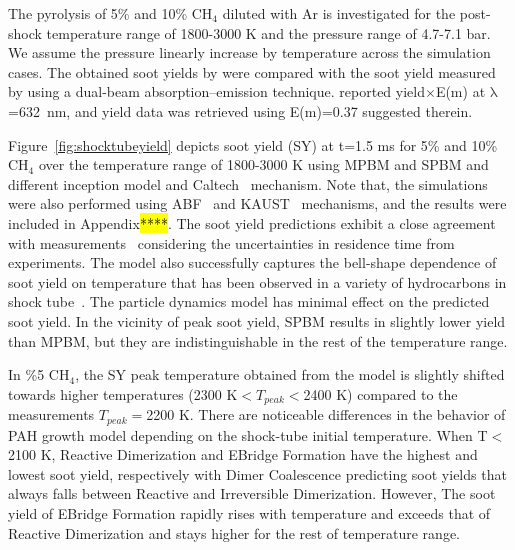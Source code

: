 The pyrolysis of 5\% and 10\% $\mathrm{CH_4}$ diluted with Ar is investigated for the post-shock temperature range of 1800-3000 K and the pressure range of 4.7-7.1 bar. We assume the pressure linearly increase by temperature across the simulation cases. The obtained soot yields by were compared with the soot yield measured by \citet{agafonov2016unified} using a dual-beam absorption–emission technique. \citet{agafonov2016unified} reported yield$\times$E(m) at $\mathrm{\lambda}$=632~nm, and yield data was retrieved using E(m)=0.37 suggested therein. 






Figure~\ref{fig:shocktubeyield} depicts soot yield (SY) at t=1.5 ms for 5\% and 10\% $\mathrm{CH_4}$ over the temperature range of 1800-3000 K using MPBM and SPBM and different inception model and Caltech~\citep{blanquart2009chemical} mechanism. Note that, the simulations were also performed using ABF~\citep{appel2000kinetic} and KAUST~\cite{wang2013pah} mechanisms, and the results were included in Appendix\hl{****}. The soot yield predictions exhibit a close agreement with measurements~\citep{agafonov2016unified} considering the uncertainties in residence time from experiments. The model also successfully captures the bell-shape dependence of soot yield on temperature that has been observed in a variety of hydrocarbons in shock tube~\citep{kellerer1996soot,knorre1996soot}. The particle dynamics model has minimal effect on the predicted soot yield. In the vicinity of peak soot yield, SPBM results in slightly lower yield than MPBM, but they are indistinguishable in the rest of the temperature range. 

In \%5 $\mathrm{CH_4}$, the SY peak temperature obtained from the model is slightly shifted towards higher temperatures (2300 K$<T_{peak}<$2400 K) compared to the measurements $T_{peak}=$2200 K. There are noticeable differences in the behavior of PAH growth model depending on the shock-tube initial temperature. When T$<$2100 K, Reactive Dimerization and EBridge Formation have the highest and lowest soot yield, respectively with Dimer Coalescence predicting soot yields that always falls between Reactive and Irreversible Dimerization. However, The soot yield of EBridge Formation rapidly rises with temperature and exceeds that of Reactive Dimerization and stays higher for the rest of temperature range.

